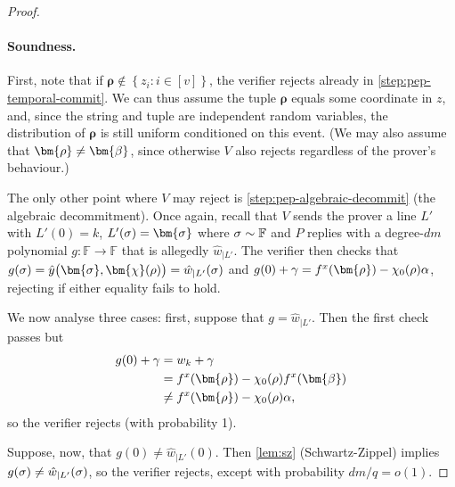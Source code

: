 \documentclass[10pt,a4paper]{article}
\newif\iflipics\lipicsfalse
\theoremstyle{definition}
\newcommand{\field}{\mathbb{F}}
\renewcommand{\set}[1]{\left\{#1\right\}}
\newcommand{\vcommitlength}{v}
\newcommand{\vcommitstring}{z}
\newcommand{\pcommitstring}{y}
\newcommand{\dimension}{m}
\newcommand{\degree}{d}
\newcommand{\fieldsize}{q}
\newcommand{\evaluationpoint}{\bm{\fe2}}
\newcommand{\fingerprinttuple}{\bm{\rho}}
\newcommand{\Fingerprinttuple}{\bm{\sigma}}
\renewcommand{\line}{L}
\def\fe#1{
    \ifnum#1=1
        \alpha
    \else
    \ifnum#1=2
        \beta
    \else
    \ifnum#1=3
        \gamma
    \fi\fi\fi
}
\def\rfe#1{
    \ifnum#1=1
        \rho
    \else
    \ifnum#1=2
        \sigma
    \else
    \fi\fi
}
\begin{document}
\begin{proof}
    \paragraph*{Soundness\iflipics\else.\fi} First, note that if $\fingerprinttuple \notin \set{\vcommitstring_i : i \in [\vcommitlength]}$, the verifier rejects already in \cref{step:pep-temporal-commit}. We can thus assume the tuple $\fingerprinttuple$ equals some coordinate in $\vcommitstring$, and, since the string and tuple are independent random variables, the distribution of $\fingerprinttuple$ is still uniform conditioned on this event. (We may also assume that $\fingerprinttuple \neq \evaluationpoint$, since otherwise $V$ also rejects regardless of the prover's behaviour.)

    The only other point where $V$ may reject is \cref{step:pep-algebraic-decommit} (the algebraic decommitment). Once again, recall that $V$ sends the prover a line $\line'$ with $\line'(0) = k$, $\line'(\rfe2) = \Fingerprinttuple$ where $\rfe2 \sim \field$ and $P$ replies with a degree-$\degree\dimension$ polynomial $g: \field \to \field$ that is allegedly $\hat w_{|\line'}$. The verifier then checks that $g(\rfe2) = \hat \pcommitstring\big(\Fingerprinttuple, \bm{\chi}(\rfe1)\big) = \hat w_{|\line'}(\rfe2)$ and $g(0) + \fe3 = f^x(\fingerprinttuple) - \chi_0(\rfe1) \fe1$, rejecting if either equality fails to hold.
    
    We now analyse three cases: first, suppose that $g = \hat w_{|\line'}$. Then the first check passes but
   \begin{align*}
        g(0) + \fe3 &= w_k + \fe3\\
        &= f^x(\fingerprinttuple) - \chi_0(\rfe1) f^x(\evaluationpoint)\\
        &\neq f^x(\fingerprinttuple) - \chi_0(\rfe1) \fe1,
   \end{align*}
   so the verifier rejects (with probability 1).

    Suppose, now, that $g(0) \neq \hat w_{|\line'}(0)$. Then \cref{lem:sz} (Schwartz-Zippel) implies $g(\rfe2) \neq \hat w_{|\line'}(\rfe2)$, so the verifier rejects, except with probability $\degree\dimension/\fieldsize = o(1)$.
    

\end{proof}
\end{document}
